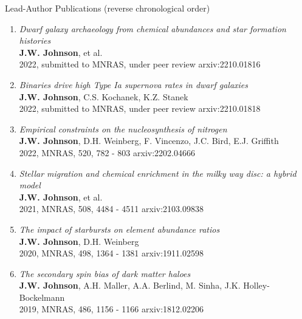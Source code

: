 \documentclass[cv.tex]{subfiles}
\begin{document}
\par\null\par\null\par\noindent
{\color{themecolor} \large Lead-Author Publications}
(reverse chronological order)
\par\noindent
\begin{enumerate}

	\vspace{-3mm}

	\item \textit{Dwarf galaxy archaeology from chemical abundances and star
	formation histories}
	\\
	\textbf{J.W. Johnson}, et al.
	\\
	2022, submitted to MNRAS, under peer review \hfill arxiv:2210.01816

	\item \textit{Binaries drive high Type Ia supernova rates in dwarf
	galaxies}
	\\
	\textbf{J.W. Johnson}, C.S. Kochanek, K.Z. Stanek
	\\
	2022, submitted to MNRAS, under peer review \hfill arxiv:2210.01818

	\item \textit{Empirical constraints on the nucleosynthesis of nitrogen}
	\\
	\textbf{J.W. Johnson}, D.H. Weinberg, F. Vincenzo, J.C. Bird, E.J. Griffith
	\\
	2022, MNRAS, 520, 782 - 803 \hfill arxiv:2202.04666

	\item \textit{Stellar migration and chemical enrichment in the milky way
	disc: a hybrid model}
	\\
	\textbf{J.W. Johnson}, et al.
	\\
	2021, MNRAS, 508, 4484 - 4511 \hfill arxiv:2103.09838

	\item \textit{The impact of starbursts on element abundance ratios}
	\\
	\textbf{J.W. Johnson}, D.H. Weinberg
	\\
	2020, MNRAS, 498, 1364 - 1381 \hfill arxiv:1911.02598

	\item \textit{The secondary spin bias of dark matter haloes}
	\\
	\textbf{J.W. Johnson}, A.H. Maller, A.A. Berlind, M. Sinha,
	J.K. Holley-Bockelmann
	\\
	2019, MNRAS, 486, 1156 - 1166 \hfill arxiv:1812.02206

\end{enumerate}
\end{document}
